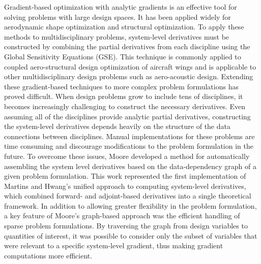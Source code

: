 \documentclass[]{aiaa-tc} %
\begin{document}
    Gradient-based optimization with analytic gradients is an effective tool for solving problems
    with large design spaces. It has been applied widely for aerodynamic shape optimization \cite{Liou2010,palacios2012adjoint}
    and structural optimization\cite{Kennedy:2013:TACS, Venkataraman:2004:SOC, Adelman:1986:structure-sensitivity}.
    To apply these methods to multidisciplinary problems, system-level derivatives must be
    constructed by combining the partial derivatives from each discipline using the Global Sensitivity
    Equations\cite{Sobieski1990} (GSE). This technique is commonly applied to coupled
    aero-structural design optimization of aircraft wings\cite{Kenway2012c, Haghighat2012} and is applicable to
    other multidisciplinary design problems such as aero-acoustic design\cite{economon2012coupled}. Extending these
    gradient-based techniques to more complex problem formulations has proved difficult. When
    design problems grow to include tens of disciplines, it becomes increasingly challenging to construct the
    necessary derivatives. Even assuming all of the disciplines provide analytic partial derivatives,
    constructing the system-level derivatives depends heavily on the structure of the data connections
    between disciplines. Manual implementations for these problems are time consuming and discourage modifications
    to the problem formulation in the future. To overcome these issues, Moore developed a method for automatically assembling the system
    level derivatives based on the data-dependency graph of a given problem formulation\cite{openmdao_derivatives}. This
    work represented the first implementation of Martins and Hwang's unified approach to computing system-level derivatives,
    which combined forward- and adjoint-based derivatives into a single theoretical framework\cite{martins2013}.
    In addition to allowing greater flexibility in the problem formulation, a key feature of Moore's graph-based approach was the efficient
    handling of sparse problem formulations. By traversing the graph from design variables to quantities of interest,
    it was possible to consider only the subset of variables that were relevant to a specific system-level gradient, thus
    making gradient computations more efficient.
\end{document}
